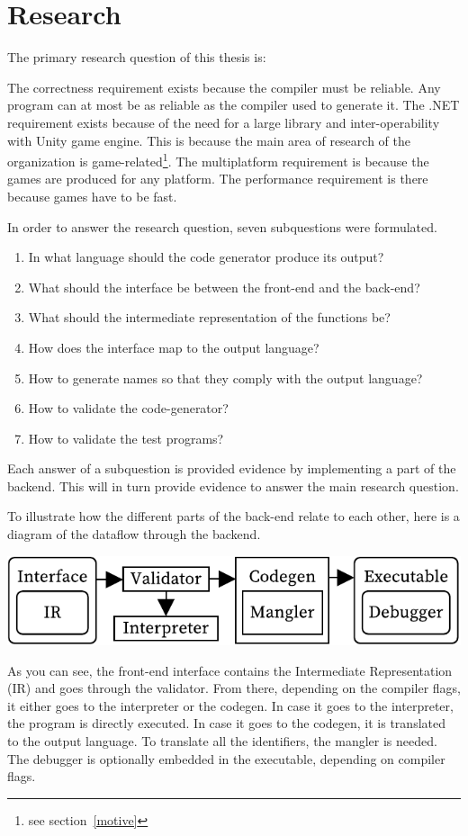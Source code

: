 \section{Research}\label{research}

The primary research question of this thesis is:



The correctness requirement exists because the compiler must be reliable.
Any program can at most be as reliable as the compiler used to generate it.
\label{whydotnet}
The .NET requirement exists because of the need for a large library and inter-operability with Unity game engine.
This is because the main area of research of the organization is game-related\footnote{see section~\ref{motive}}.
The multiplatform requirement is because the games are produced for any platform.
The performance requirement is there because games have to be fast.

In order to answer the research question, seven subquestions were formulated.

\begin{enumerate}
    \item In what language should the code generator produce its output?
    \item What should the interface be between the front-end and the back-end?
    \item What should the intermediate representation of the functions be?
    \item How does the interface map to the output language?
    \item How to generate names so that they comply with the output language?
    \item How to validate the code-generator?
    \item How to validate the test programs?
\end{enumerate}

Each answer of a subquestion is provided evidence by implementing a part of the backend. 
This will in turn provide evidence to answer the main research question.

To illustrate how the different parts of the back-end relate to each other, here is a diagram of the dataflow through the backend.

\includegraphics[width=\columnwidth]{overview}

As you can see, the front-end interface contains the Intermediate Representation (IR) and goes through the validator.
From there, depending on the compiler flags, it either goes to the interpreter or the codegen.
In case it goes to the interpreter, the program is directly executed.
In case it goes to the codegen, it is translated to the output language.
To translate all the identifiers, the mangler is needed.
The debugger is optionally embedded in the executable, depending on compiler flags.

